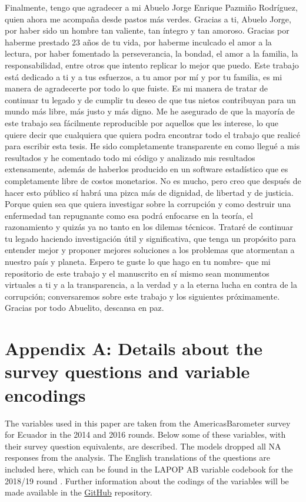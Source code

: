 \documentclass[12pt,a4]{article}\usepackage[]{graphicx}\usepackage[]{xcolor}
\begin{document}
Finalmente, tengo que agradecer a mi Abuelo Jorge Enrique Pazmiño Rodríguez, quien ahora me acompaña desde pastos más verdes. Gracias a ti, Abuelo Jorge, por haber sido un hombre tan valiente, tan íntegro y tan amoroso. Gracias por haberme prestado 23 años de tu vida, por haberme inculcado el amor a la lectura, por haber fomentado la perseverancia, la bondad, el amor a la familia, la responsabilidad, entre otros que intento replicar lo mejor que puedo. Este trabajo está dedicado a ti y a tus esfuerzos, a tu amor por mí y por tu familia, es mi manera de agradecerte por todo lo que fuiste. Es mi manera de tratar de continuar tu legado y de cumplir tu deseo de que tus nietos contribuyan para un mundo más libre, más justo y más digno. Me he asegurado de que la mayoría de este trabajo sea fácilmente reproducible por aquellos que les interese, lo que quiere decir que cualquiera que quiera podra encontrar todo el trabajo que realicé para escribir esta tesis. He sido completamente transparente en como llegué a mis resultados y he comentado todo mi código y analizado mis resultados extensamente, además de haberlos producido en un software estadístico que es completamente libre de costos monetarios. No es mucho, pero creo que después de hacer esto público sí habrá una pizca más de dignidad, de libertad y de justicia. Porque quien sea que quiera investigar sobre la corrupción y como destruir una enfermedad tan repugnante como esa podrá enfocarse en la teoría, el razonamiento y quizás ya no tanto en los dilemas técnicos. Trataré de continuar tu legado haciendo investigación útil y significativa, que tenga un propósito para entender mejor y proponer mejores soluciones a los problemas que atormentan a nuestro país y planeta. Espero te guste lo que hago en tu nombre- que mi repositorio de este trabajo y el manuscrito en sí mismo sean monumentos virtuales a ti y a la transparencia, a la verdad y a la eterna lucha en contra de la corrupción; conversaremos sobre este trabajo y los siguientes próximamente. Gracias por todo Abuelito, descansa en paz. 






\section{Appendix A: Details about the survey questions and variable encodings}
\label{app:first}

The variables used in this paper are taken from the AmericasBarometer survey for Ecuador in the 2014 and 2016 rounds. Below some of these variables, with their survey question equivalents, are described. The models dropped all NA responses from the analysis. The English translations of the questions are included here, which can be found in the LAPOP AB variable codebook for the 2018/19 round \parencite{LAPOP.2019}. Further information about the codings of the variables will be made available in the \href{https://github.com/dsanchezp18/hbc-v2}{GitHub} repository. 
\end{document}
